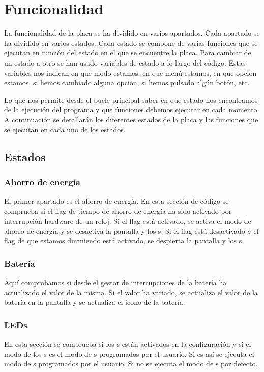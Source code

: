 \section{Funcionalidad}

La funcionalidad de la placa se ha dividido en varios apartados. Cada apartado se ha dividido en varios estados. Cada estado se compone de varias funciones que se ejecutan en función del estado en el que se encuentre la placa. Para cambiar de un estado a otro se han usado variables de estado a lo largo del código. Estas variables nos indican en que modo estamos, en que menú estamos, en que opción estamos, si hemos cambiado alguna opción, si hemos pulsado algún botón, etc.

Lo que nos permite desde el bucle principal saber en qué estado nos encontramos de la ejecución del programa y que funciones debemos ejecutar en cada momento. A continuación se detallarán los diferentes estados de la placa y las funciones que se ejecutan en cada uno de los estados.

\subsection{Estados}
\subsubsection{Ahorro de energía}
El primer apartado es el ahorro de energía. En esta sección de código se comprueba si el flag de tiempo de ahorro de energía ha sido activado por interrupción hardware de un reloj. Si el flag está activado, se activa el modo de ahorro de energía y se desactiva la pantalla y los s. Si el flag está desactivado y el flag de que estamos durmiendo está activado, se despierta la pantalla y los s.

\subsubsection{Batería}
Aquí comprobamos si desde el gestor de interrupciones de la batería ha actualizado el valor de la misma. Si el valor ha variado, se actualiza el valor de la batería en la pantalla y se actualiza el icono de la batería.

\subsubsection{\gls{LED}s}
En esta sección se comprueba si los s están activados en la configuración y si el modo de los s es el modo de s programados por el usuario. Si es así se ejecuta el modo de s programados por el usuario. Si no se ejecuta el modo de s por defecto.

